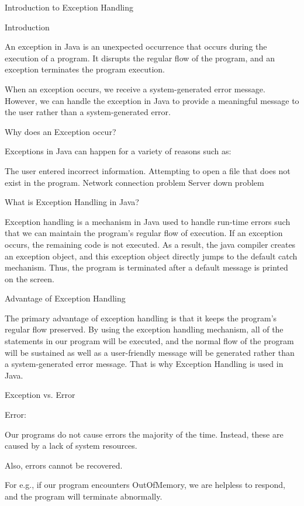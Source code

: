 Introduction to Exception Handling
 

 

Introduction
 

An exception in Java is an unexpected occurrence that occurs during the execution of a program. It disrupts the regular flow of the program, and an exception terminates the program execution.

When an exception occurs, we receive a system-generated error message. However, we can handle the exception in Java to provide a meaningful message to the user rather than a system-generated error.

 

 

Why does an Exception occur?
 

Exceptions in Java can happen for a variety of reasons such as:

The user entered incorrect information.
Attempting to open a file that does not exist in the program.
Network connection problem
Server down problem
 

What is Exception Handling in Java?
 

Exception handling is a mechanism in Java used to handle run-time errors such that we can maintain the program's regular flow of execution. If an exception occurs, the remaining code is not executed. As a result, the java compiler creates an exception object, and this exception object directly jumps to the default catch mechanism. Thus, the program is terminated after a default message is printed on the screen.

 


Advantage of Exception Handling
 

The primary advantage of exception handling is that it keeps the program's regular flow preserved. By using the exception handling mechanism, all of the statements in our program will be executed, and the normal flow of the program will be sustained as well as a user-friendly message will be generated rather than a system-generated error message. That is why Exception Handling is used in Java.

 

Exception vs. Error
 

Error:
 

Our programs do not cause errors the majority of the time. Instead, these are caused by a lack of system resources.

Also, errors cannot be recovered.

For e.g., if our program encounters OutOfMemory, we are helpless to respond, and the program will terminate abnormally.

